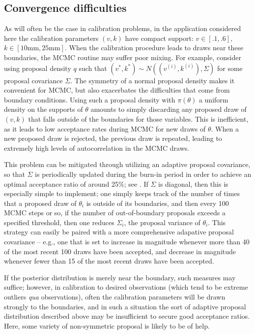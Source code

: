 \documentclass{article}
\begin{document}
\subsection{Convergence difficulties}\label{convergence_difficulties}
As will often be the case in calibration problems, in the application considered here the calibration parameters $(v,k)$ have compact support: $v\in [.1,.6],$ $k\in [10\mathrm{mm},25\mathrm{mm}]$. When the calibration procedure leads to draws near these boundaries, the MCMC routine may suffer poor mixing. For example, consider using proposal density $q$ such that $(v^*,k^*)\sim N((v^{(i)},k^{(i)}),\Sigma)$ for some proposal covariance $\Sigma$. The symmetry of a normal proposal density makes it convenient for MCMC, but also exacerbates the difficulties that come from boundary conditions. Using such a proposal density with $\pi(\theta)$ a uniform density on the supports of $\theta$ amounts to simply discarding any proposed draw of $(v,k)$ that falls outside of the boundaries for those variables. This is inefficient, as it leads to low acceptance rates during MCMC for new draws of $\theta$. When a new proposed draw is rejected, the previous draw is repeated, leading to extremely high levels of autocorrelation in the MCMC draws.

This problem can be mitigated through utilizing an adaptive proposal covariance, so that $\Sigma$ is periodically updated during the burn-in period in order to achieve an optimal acceptance ratio of around 25\%; see \cite{Roberts1997}. If $\Sigma$ is diagonal, then this is especially simple to implement; one simply keeps track of the number of times that a proposed draw of $\theta_i$ is outside of its boundaries, and then every 100 MCMC steps or so, if the number of out-of-boundary proposals exceeds a specified threshold, then one reduces $\Sigma_i$, the proposal variance of $\theta_i$. This strategy can easily be paired with a more comprehensive adapative proposal covariance -- e.g., one that is set to increase in magnitude whenever more than 40 of the most recent 100 draws have been accepted, and decrease in magnitude whenever fewer than 15 of the most recent draws have been accepted.

If the posterior distribution is merely near the boundary, such measures may suffice; however, in calibration to desired observations (which tend to be extreme outliers \textit{qua} observations), often the calibration parameters will be drawn strongly to the boundaries, and in such a situation the sort of adaptive proposal distribution described above may be insufficient to secure good acceptance ratios. Here, some variety of non-symmetric proposal is likely to be of help.
\end{document}
